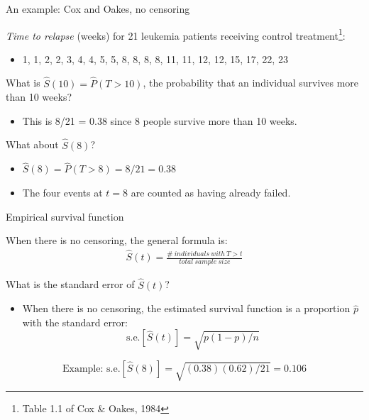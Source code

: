 \documentclass[ignorenonframetext,]{beamer}
\providecommand{\tightlist}{%
  \setlength{\itemsep}{0pt}\setlength{\parskip}{0pt}}
\begin{document}
\begin{frame}{%
\protect\hypertarget{an-example-cox-and-oakes-no-censoring}{%
An example: Cox and Oakes, no censoring}}

\emph{Time to relapse} (weeks) for 21 leukemia patients receiving
control treatment\footnote{Table 1.1 of Cox \& Oakes, 1984}:

\begin{itemize}
\tightlist
\item
  1, 1, 2, 2, 3, 4, 4, 5, 5, 8, 8, 8, 8, 11, 11, 12, 12, 15, 17, 22, 23
\end{itemize}

What is \(\widehat{S}(10) = \widehat{P}(T > 10)\), the probability that
an individual survives more than 10 weeks?

\begin{itemize}
\tightlist
\item
  This is 8/21 = 0.38 since 8 people survive more than 10 weeks.
\end{itemize}

What about \(\widehat{S}(8)\)?

\begin{itemize}
\tightlist
\item
  \(\widehat{S}(8) = \widehat P(T > 8) = 8/21 = 0.38\)
\item
  The four events at \(t = 8\) are counted as having already failed.
\end{itemize}

\end{frame}

\begin{frame}{%
\protect\hypertarget{empirical-survival-function}{%
Empirical survival function}}

When there is no censoring, the general formula is: \begin{align*}
\widehat{S}(t) = \frac{\#~individuals~ with~T > t}
       {total~sample~size}
\end{align*}

What is the standard error of \(\widehat{S}(t)\)?

\begin{itemize}
\tightlist
\item
  When there is no censoring, the estimated survival function is a
  proportion \(\hat{p}\) with the standard error: \[
  \text{s.e.}[\widehat{S}(t)] = \sqrt{p(1-p)/n}
  \]
\end{itemize}

\[\text{Example: s.e.}[\widehat{S}(8)]= \sqrt{(0.38)(0.62)/21} = 0.106 \]

\end{frame}
\end{document}
